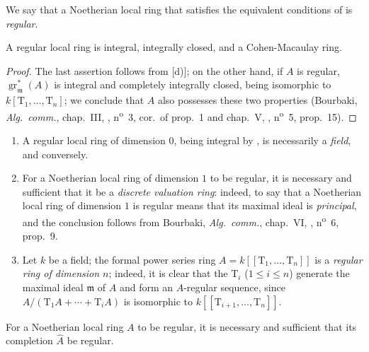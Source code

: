 \begin{definition}[17.1.2]
\label{0.17.1.2}
We say that a Noetherian local ring that satisfies the equivalent conditions of  is \emph{regular}.
\end{definition}

\begin{corollary}[17.1.3]
\label{0.17.1.3}
A regular local ring is integral, integrally closed, and a Cohen-Macaulay ring.
\end{corollary}

\begin{proof}
The last assertion follows from [d)];
on the other hand, if $A$ is regular, $\operatorname{gr}^*_\mathfrak{m}(A)$ is integral and completely integrally closed, being isomorphic to $k[\mathrm{T}_1,\ldots,\mathrm{T}_n]$;
we conclude that $A$ also possesses these two properties (Bourbaki, \emph{Alg.~comm.}, chap.~III, , n\textsuperscript{o}~3, cor.\ of prop.~1 and chap.~V, , n\textsuperscript{o}~5, prop.~15).
\end{proof}

\begin{example}[17.1.4]
\label{0.17.1.4}
\begin{enumerate}
  \item[{\rm(i)}] A regular local ring of dimension $0$, being integral by , is necessarily a \emph{field}, and conversely.
  \item[{\rm(ii)}] For a Noetherian local ring of dimension $1$ to be regular, it is necessary and sufficient that it be a \emph{discrete valuation ring}:
  indeed, to say that a Noetherian local ring of dimension $1$ is regular means that its maximal ideal is \emph{principal}, and the conclusion follows from Bourbaki, \emph{Alg.~comm.}, chap.~VI, , n\textsuperscript{o}~6, prop.~9.
  \item[{\rm(iii)}] Let $k$ be a field; the formal power series ring $A=k[[\mathrm{T}_1,\ldots,\mathrm{T}_n]]$ is a \emph{regular ring of dimension $n$};
  indeed, it is clear that the $\mathrm{T}_i$ ($1\leq i\leq n$) generate the maximal ideal $\mathfrak{m}$ of $A$ and form an $A$-regular sequence, since $A/(\mathrm{T}_1 A+\cdots+\mathrm{T}_i A)$ is isomorphic to $k[[\mathrm{T}_{i+1},\ldots,\mathrm{T}_n]]$.
\end{enumerate}
\end{example}

\begin{proposition}[17.1.5]
\label{0.17.1.5}
For a Noetherian local ring $A$ to be regular, it is necessary and sufficient that its completion $\widehat{A}$ be regular.
\end{proposition}

